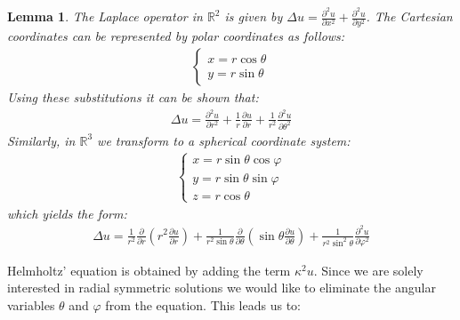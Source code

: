 \documentclass[a4paper,11pt]{article}
\newcommand{\R}{\ensuremath{\mathbb{R}}}   %
\newcommand{\comment}[1]{\textbf{\textcolor{blue}{#1}}\newline}
\newtheorem{lemma}[theorem]{Lemma}
\theoremstyle{definition}
\numberwithin{equation}{section}
\begin{document}
	\begin{lemma} \label{lemma:laplace}
		The Laplace operator in $\R^2$ is given by $\Delta u = \frac{\partial^2 u}{\partial x^2} + \frac{\partial^2 u}{\partial y^2}$. The Cartesian coordinates can be represented by polar coordinates as follows: 
		\begin{align*}
			\begin{cases}
				x = r \cos \theta \\
				y = r \sin \theta
			\end{cases}
		\end{align*}
		Using these substitutions it can be shown that:
		\begin{align*}
			\Delta u = \frac{\partial^2 u}{\partial r^2} + \frac{1}{r} \frac{\partial u}{\partial r} + \frac{1}{r^2} \frac{\partial^2 u}{\partial \theta^2}
		\end{align*}
		Similarly, in $\R^3$ we transform to a spherical coordinate system:
		\begin{align*}
			\begin{cases}
				x = r \sin \theta \cos \varphi \\
				y = r \sin \theta \sin \varphi \\
				z = r \cos \theta
			\end{cases}
		\end{align*}
		which yields the form:
		\begin{align}
			\Delta u = \frac{1}{r^2} \frac{\partial}{\partial r} \left( r^2 \frac{\partial u}{\partial r} \right) + \frac{1}{r^2 \sin \theta} \frac{\partial}{\partial \theta} \left( \sin \theta \frac{\partial u}{\partial \theta} \right) + \frac{1}{r^2 \sin^2 \theta} \frac{\partial^2 u}{\partial \varphi^2}
		\end{align}
	\end{lemma}
	\vspace{5mm}
	
	Helmholtz' equation is obtained by adding the term $\kappa^2 u$. Since we are solely interested in radial symmetric solutions we would like to eliminate the angular variables $\theta$ and $\varphi$ from the equation. This leads us to:

	
	
	\listoffigures
	


	\nocite{*}
	\printbibliography[heading=bibintoc]%
	
\end{document}
